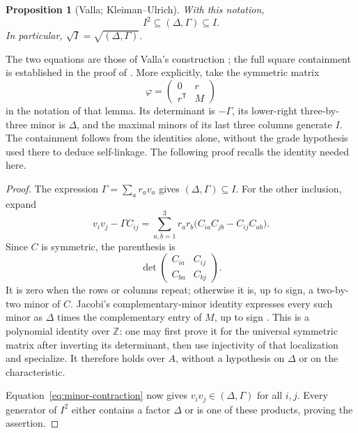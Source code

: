 \documentclass[11pt]{amsart}
\newtheorem{proposition}[theorem]{Proposition}
\theoremstyle{remark}
\begin{document}
\begin{proposition}[Valla; Kleiman--Ulrich]\label{prop:symmetric}
With this notation,
\[
 I^2\subseteq(\Delta,\Gamma)\subseteq I.
\]
In particular, $\sqrt I=\sqrt{(\Delta,\Gamma)}$.
\end{proposition}

The two equations are those of Valla's construction \cite[Theorem~2.1]{Valla1980}; the full square containment is established in the proof of \cite[Lemma~2.5(3)]{KleimanUlrich1997}. More explicitly, take the symmetric matrix
\[
 \varphi=\begin{pmatrix}0&r\\r^{\mathsf T}&M\end{pmatrix}
\]
in the notation of that lemma. Its determinant is $-\Gamma$, its lower-right three-by-three minor is $\Delta$, and the maximal minors of its last three columns generate $I$. The containment follows from the identities alone, without the grade hypothesis used there to deduce self-linkage. The following proof recalls the identity needed here.

\begin{proof}
The expression $\Gamma=\sum_a r_av_a$ gives $(\Delta,\Gamma)\subseteq I$. For the other inclusion, expand
\begin{equation}\label{eq:minor-contraction}
 v_iv_j-\Gamma C_{ij}
 =\sum_{a,b=1}^3 r_ar_b
   \bigl(C_{ia}C_{jb}-C_{ij}C_{ab}\bigr).
\end{equation}
Since $C$ is symmetric, the parenthesis is
\[
 \det\begin{pmatrix}C_{ia}&C_{ij}\\C_{ba}&C_{bj}\end{pmatrix}.
\]
It is zero when the rows or columns repeat; otherwise it is, up to sign, a two-by-two minor of $C$. Jacobi's complementary-minor identity expresses every such minor as $\Delta$ times the complementary entry of $M$, up to sign \cite[p.~467]{Lawrence1964}. This is a polynomial identity over $\mathbb Z$: one may first prove it for the universal symmetric matrix after inverting its determinant, then use injectivity of that localization and specialize. It therefore holds over $A$, without a hypothesis on $\Delta$ or on the characteristic.

Equation~\eqref{eq:minor-contraction} now gives $v_iv_j\in(\Delta,\Gamma)$ for all $i,j$. Every generator of $I^2$ either contains a factor $\Delta$ or is one of these products, proving the assertion.
\end{proof}
\end{document}
